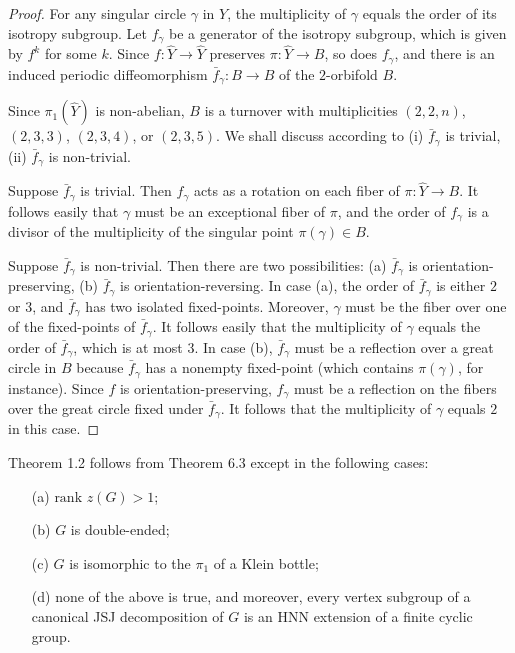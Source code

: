 \documentclass[11pt]{amsart}
\theoremstyle{plain}
\numberwithin{theorem}{section}
\theoremstyle{definition}
\begin{document}
\begin{proof} 
For any singular circle $\gamma$ in $Y$, the multiplicity of $\gamma$ equals the order of its 
isotropy subgroup. Let $f_\gamma$ be a generator of the isotropy subgroup, which is given 
by $f^k$ for some $k$. Since $f:\hat{Y}\rightarrow \hat{Y}$ preserves $\pi:\hat{Y}\rightarrow B$, 
so does $f_\gamma$, and there is an induced periodic diffeomorphism $\bar{f}_\gamma:
B\rightarrow B$ of the $2$-orbifold $B$. 

Since $\pi_1(\hat{Y})$ is non-abelian, $B$ is a turnover with multiplicities $(2,2,n)$, $(2,3,3)$,
$(2,3,4)$, or $(2,3,5)$. We shall discuss according to (i) $\bar{f}_\gamma$ is trivial, (ii) 
$\bar{f}_\gamma$ is non-trivial.

Suppose $\bar{f}_\gamma$ is trivial. Then $f_\gamma$ acts as a rotation on each fiber of 
$\pi:\hat{Y}\rightarrow B$. It follows easily that $\gamma$ must be an exceptional fiber of
$\pi$, and the order of $f_\gamma$ is a divisor of the multiplicity of the singular point 
$\pi(\gamma)\in B$. 

Suppose $\bar{f}_\gamma$ is non-trivial. Then there are two possibilities: (a) $\bar{f}_\gamma$ 
is orientation-preserving, (b) $\bar{f}_\gamma$ is orientation-reversing. In case (a), the order
of $\bar{f}_\gamma$ is either $2$ or $3$, and $\bar{f}_\gamma$ has two isolated fixed-points.
Moreover, $\gamma$ must be the fiber over one of the fixed-points of $\bar{f}_\gamma$.
It follows easily that the multiplicity of $\gamma$ equals the order of $\bar{f}_\gamma$, which
is at most $3$. In case (b), $\bar{f}_\gamma$ must be a reflection over a great circle in $B$ because
$\bar{f}_\gamma$ has a nonempty fixed-point (which contains $\pi(\gamma)$, for instance). Since
$f$ is orientation-preserving, $f_\gamma$ must be a reflection on the fibers over the great circle
fixed under $\bar{f}_\gamma$. It follows that the multiplicity of $\gamma$ equals $2$ in this case.

\end{proof}


\vspace{3mm}

Theorem 1.2 follows from Theorem 6.3 except in the following cases:

\begin{itemize}
\item [{(a)}] $\text{rank }z(G)>1$;
\item [{(b)}] $G$ is double-ended;
\item [{(c)}] $G$ is isomorphic to the $\pi_1$ of a Klein bottle;
\item [{(d)}] none of the above is true, and moreover, every vertex subgroup of a canonical JSJ decomposition of $G$ is an HNN extension of a finite cyclic group.
\end{itemize}
\end{document}
